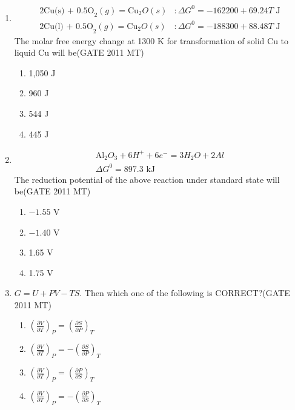 \documentclass[12pt]{article}
\begin{document}
\begin{enumerate}
\item 
\begin{align*}
\text{2Cu(s) + 0.5O}_2(g) = \text{Cu}_2O(s) & : \Delta G^0 = -162200 + 69.24T \text{ J} \\
\text{2Cu(l) + 0.5O}_2(g) = \text{Cu}_2O(s) & : \Delta G^0 = -188300 + 88.48T \text{ J}
\end{align*}
The molar free energy change at 1300 K for transformation of solid Cu to liquid Cu will be(GATE 2011 MT)
    \begin{enumerate}
        \item 1,050 J
        \item 960 J
        \item 544 J
        \item 445 J
    \end{enumerate}
\item 
\begin{align*}
\text{Al}_2O_3 + 6H^+ + 6e^- = 3H_2O + 2Al \\
\Delta G^0 = 897.3 \text{ kJ}
\end{align*}
The reduction potential of the above reaction under standard state will be(GATE 2011 MT)
    \begin{enumerate}
        \item $-1.55$ V
        \item $-1.40$ V
        \item 1.65 V
        \item 1.75 V
    \end{enumerate}
\item \(G = U + PV - TS\). Then which one of the following is CORRECT?(GATE 2011 MT)
    \begin{enumerate}
        \item \((\frac{\partial V}{\partial T})_P = (\frac{\partial S}{\partial P})_T\)
        \item \((\frac{\partial V}{\partial T})_P = -(\frac{\partial S}{\partial P})_T\)
        \item \((\frac{\partial V}{\partial T})_P = (\frac{\partial P}{\partial S})_T\)
        \item \((\frac{\partial V}{\partial T})_P = -(\frac{\partial P}{\partial S})_T\)
    \end{enumerate}


\end{enumerate}
\end{document}
